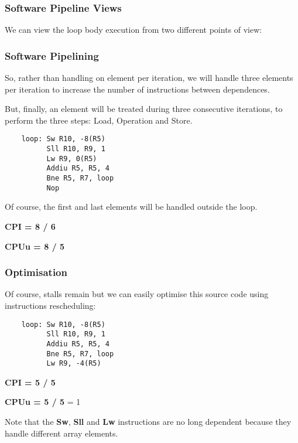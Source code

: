 
\begin{frame}
  \frametitle{Software Pipeline Views}

  We can view the loop body execution from two different points of view:

  \begin{center}
  \end{center}
\end{frame}


\begin{frame}[containsverbatim]
  \frametitle{Software Pipelining}

  So, rather than handling on element per iteration, we will handle
  three elements per iteration to increase the number of instructions
  between dependences.

  \nl

  But, finally, an element will be treated during three consecutive
  iterations, to perform the three steps: Load, Operation and Store.

  \begin{verbatim}
    loop: Sw R10, -8(R5)
          Sll R10, R9, 1
          Lw R9, 0(R5)
          Addiu R5, R5, 4
          Bne R5, R7, loop
          Nop
  \end{verbatim}

  Of course, the first and last elements will be handled outside the loop.

  \nl

  \textbf{CPI = 8 / 6}

  \textbf{CPUu = 8 / 5}
\end{frame}


\begin{frame}[containsverbatim]
  \frametitle{Optimisation}

  Of course, stalls remain but we can easily optimise this source code
  using instructions rescheduling:

  \begin{verbatim}
    loop: Sw R10, -8(R5)
          Sll R10, R9, 1
          Addiu R5, R5, 4
          Bne R5, R7, loop
          Lw R9, -4(R5)
  \end{verbatim}

  \textbf{CPI = 5 / 5}

  \textbf{CPUu = 5 / 5} \alert{= 1}

  \nl

  Note that the \textbf{Sw}, \textbf{Sll} and \textbf{Lw} instructions
  are no long dependent because they handle different array elements.
\end{frame}


